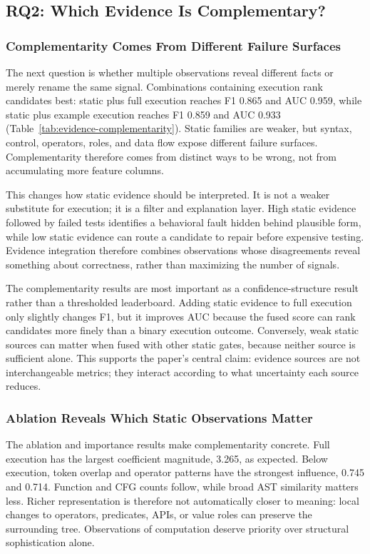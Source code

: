 ﻿\documentclass[conference]{IEEEtran}
\begin{document}
\subsection{RQ2: Which Evidence Is Complementary?}
\subsubsection{Complementarity Comes From Different Failure Surfaces}
The next question is whether multiple observations reveal different facts or merely rename the same signal. Combinations containing execution rank candidates best: static plus full execution reaches F1 0.865 and AUC 0.959, while static plus example execution reaches F1 0.859 and AUC 0.933 (Table~\ref{tab:evidence-complementarity}). Static families are weaker, but syntax, control, operators, roles, and data flow expose different failure surfaces. Complementarity therefore comes from distinct ways to be wrong, not from accumulating more feature columns.

This changes how static evidence should be interpreted. It is not a weaker substitute for execution; it is a filter and explanation layer. High static evidence followed by failed tests identifies a behavioral fault hidden behind plausible form, while low static evidence can route a candidate to repair before expensive testing. Evidence integration therefore combines observations whose disagreements reveal something about correctness, rather than maximizing the number of signals.


The complementarity results are most important as a confidence-structure result rather than a thresholded leaderboard. Adding static evidence to full execution only slightly changes F1, but it improves AUC because the fused score can rank candidates more finely than a binary execution outcome. Conversely, weak static sources can matter when fused with other static gates, because neither source is sufficient alone. This supports the paper's central claim: evidence sources are not interchangeable metrics; they interact according to what uncertainty each source reduces.

\subsubsection{Ablation Reveals Which Static Observations Matter}
The ablation and importance results make complementarity concrete. Full execution has the largest coefficient magnitude, 3.265, as expected. Below execution, token overlap and operator patterns have the strongest influence, 0.745 and 0.714. Function and CFG counts follow, while broad AST similarity matters less. Richer representation is therefore not automatically closer to meaning: local changes to operators, predicates, APIs, or value roles can preserve the surrounding tree. Observations of computation deserve priority over structural sophistication alone.
\end{document}
